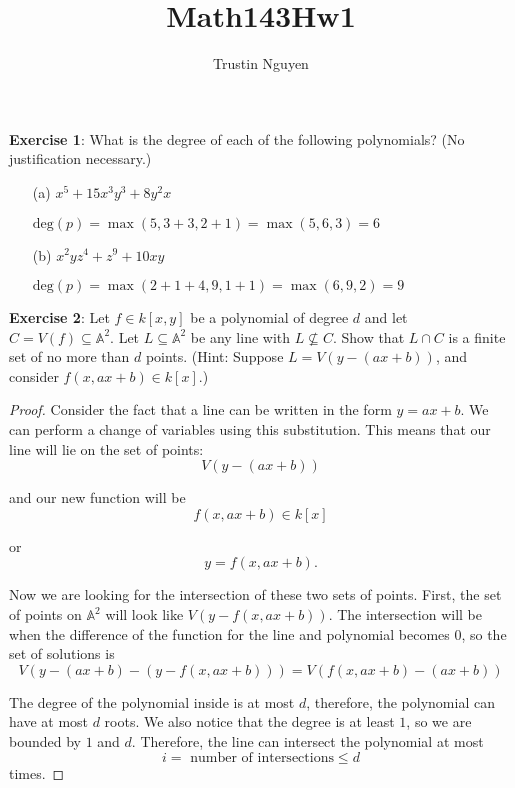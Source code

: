 \documentclass{article}
\title{Math143Hw1}
\author{Trustin Nguyen}
\begin{document}
    \maketitle

\reversemarginpar

\textbf{Exercise 1}: What is the degree of each of the following polynomials? (No justification necessary.)
    \begin{itemize}
        \item [(a)] $x^{5} + 15x^{3}y^{3} + 8y^{2}x$ 

            $\text{deg}(p) = \max(5, 3 + 3, 2 + 1) = \max(5, 6, 3) = 6$

        \item [(b)] $x^{2}yz^{4} + z^{9} + 10xy$

            $\text{deg}(p) = \max(2 + 1 + 4, 9, 1 + 1) = \max(6, 9, 2) = 9$
    \end{itemize}

\textbf{Exercise 2}: Let $f \in k[x, y]$ be a polynomial of degree $d$ and let $C = V(f) \subseteq \mathbb{A}^{2}$. Let $L \subseteq \mathbb{A}^{2}$ be any line with $L \not\subseteq C$. Show that $L \cap  C$ is a finite set of no more than $d$ points. (Hint: Suppose $L = V(y - (ax + b))$, and consider $f(x, ax + b) \in k[x]$.)
    \begin{proof}
        Consider the fact that a line can be written in the form $y = ax + b$. We can perform a change of variables using this substitution. This means that our line will lie on the set of points:
            \begin{equation*}
                V(y - (ax + b))
            \end{equation*}

        and our new function will be
            \begin{equation*}
                f(x, ax + b) \in k[x]
            \end{equation*}

        or
            \begin{equation*}
                y = f(x, ax + b).
            \end{equation*}

        Now we are looking for the intersection of these two sets of points. First, the set of points on $\mathbb{A}^{2}$ will look like $V(y - f(x, ax + b))$. The intersection will be when the difference of the function for the line and polynomial becomes 0, so the set of solutions is
            \begin{equation*}
                V(y - (ax + b) - (y - f(x, ax + b))) = V(f(x, ax + b) - (ax + b))
            \end{equation*}

        The degree of the polynomial inside is at most $d$, therefore, the polynomial can have at most $d$ roots. We also notice that the degree is at least $1$, so we are bounded by $1$ and $d$. Therefore, the line can intersect the polynomial at most 
            \begin{equation*}
                \text{$i =$ number of intersections} \leq d
            \end{equation*}
        times.
    \end{proof}
\end{document}
